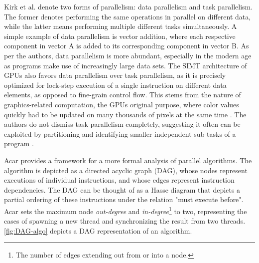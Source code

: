 \documentclass[english,12pt,a4paper,pdftex,sci,utf8]{aaltothesis}
\begin{document}
Kirk et al. \cite{kirk2016programming} denote two forms of parallelism: data parallelism and task parallelism. The former denotes performing the same operations in parallel on different data, while the latter means performing multiple different tasks simultaneously. A simple example of data parallelism is vector addition, where each respective component in vector A is added to its corresponding component in vector B. As per the authors, data parallelism is more abundant, especially in the modern age as programs make use of increasingly large data sets. The SIMT architecture of GPUs also favors data parallelism over task parallelism, as it is precisely optimized for lock-step execution of a single instruction on different data elements, as opposed to fine-grain control flow. This stems from the nature of graphics-related computation, the GPUs original purpose, where color values quickly had to be updated on many thousands of pixels at the same time \cite{sanders2010cuda}. The authors do not dismiss task parallelism completely, suggesting it often can be exploited by partitioning and identifying smaller independent sub-tasks of a program \cite{kirk2016programming}.

Acar \cite{acar2016parallel} provides a framework for a more formal analysis of parallel algorithms. The algorithm is depicted as a directed acyclic graph (DAG), whose nodes represent executions of individual instructions, and whose edges represent instruction dependencies. The DAG can be thought of as a Hasse diagram that depicts a partial ordering of these instructions under the relation "must execute before". Acar sets the maximum node \emph{out-degree} and \emph{in-degree}\footnote{The number of edges extending out from or into a node.} to two, representing the cases of spawning a new thread and synchronizing the result from two threads. \cref{fig:DAG-algo} depicts a DAG representation of an algorithm.
\end{document}
